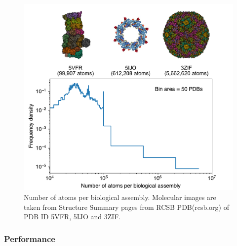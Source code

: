 \begin{figure}
\includegraphics[width=1.0\textwidth,keepaspectratio]
{./figures/num_atom_per_bio_assem.pdf}

\caption{Number of atoms per biological assembly.  Molecular images are taken
from Structure Summary pages from RCSB PDB(rcsb.org) of PDB ID
5VFR\cite{zhuStructuralMechanismNucleotidedriven2018}, 5IJO\cite{kosinskiMolecularArchitectureInner2016} and
3ZIF\cite{chengCryoEMStructuresTwo2014}.}

\label{fig: num atom per bio assem}
\end{figure}


\subsubsection{Performance}

